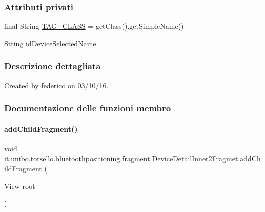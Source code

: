 \subsubsection*{Attributi privati}
\begin{DoxyCompactItemize}
\item 
final String \hyperlink{classit_1_1unibo_1_1torsello_1_1bluetoothpositioning_1_1fragment_1_1DeviceDetailInner2Fragmet_acd1f1a0a435e383240ad0222c4eb7972_acd1f1a0a435e383240ad0222c4eb7972}{T\+A\+G\+\_\+\+C\+L\+A\+SS} = get\+Class().get\+Simple\+Name()
\item 
String \hyperlink{classit_1_1unibo_1_1torsello_1_1bluetoothpositioning_1_1fragment_1_1DeviceDetailInner2Fragmet_a45380c45eac10e58571b19e50c9fc27c_a45380c45eac10e58571b19e50c9fc27c}{id\+Device\+Selected\+Name}
\end{DoxyCompactItemize}


\subsubsection{Descrizione dettagliata}
Created by federico on 03/10/16. 

\subsubsection{Documentazione delle funzioni membro}
\hypertarget{classit_1_1unibo_1_1torsello_1_1bluetoothpositioning_1_1fragment_1_1DeviceDetailInner2Fragmet_aa1467621600238fa5efde4a2cee901e0_aa1467621600238fa5efde4a2cee901e0}{}\label{classit_1_1unibo_1_1torsello_1_1bluetoothpositioning_1_1fragment_1_1DeviceDetailInner2Fragmet_aa1467621600238fa5efde4a2cee901e0_aa1467621600238fa5efde4a2cee901e0} 
\paragraph{\texorpdfstring{add\+Child\+Fragment()}{addChildFragment()}}
{\footnotesize\ttfamily void it.\+unibo.\+torsello.\+bluetoothpositioning.\+fragment.\+Device\+Detail\+Inner2\+Fragmet.\+add\+Child\+Fragment (\begin{DoxyParamCaption}\item[{View}]{root }\end{DoxyParamCaption})\hspace{0.3cm}{\ttfamily [private]}}


